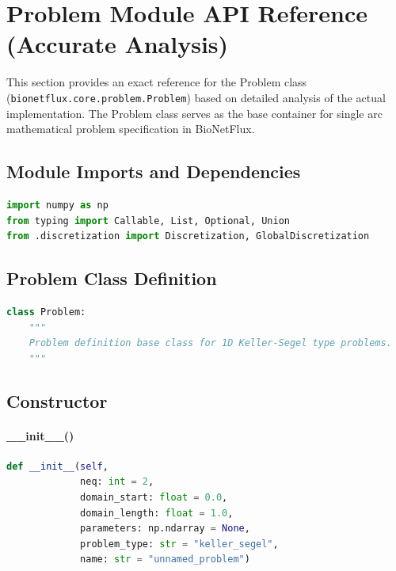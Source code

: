 % 
%

\section{Problem Module API Reference (Accurate Analysis)}
\label{sec:problem_module_api_accurate}

This section provides an exact reference for the Problem class (\texttt{bionetflux.core.problem.Problem}) based on detailed analysis of the actual implementation. The Problem class serves as the base container for single arc mathematical problem specification in BioNetFlux.

\subsection{Module Imports and Dependencies}

\begin{lstlisting}[language=Python, caption=Module Dependencies]
import numpy as np
from typing import Callable, List, Optional, Union
from .discretization import Discretization, GlobalDiscretization
\end{lstlisting}

\subsection{Problem Class Definition}
\label{subsec:problem_class_definition}

\begin{lstlisting}[language=Python, caption=Class Declaration]
class Problem:
    """
    Problem definition base class for 1D Keller-Segel type problems.
    """
\end{lstlisting}

\subsection{Constructor}
\label{subsec:constructor}

\paragraph{\_\_init\_\_()}\leavevmode
\begin{lstlisting}[language=Python, caption=Problem Constructor]
def __init__(self, 
             neq: int = 2,
             domain_start: float = 0.0,
             domain_length: float = 1.0,
             parameters: np.ndarray = None,
             problem_type: str = "keller_segel",
             name: str = "unnamed_problem")
\end{lstlisting}

